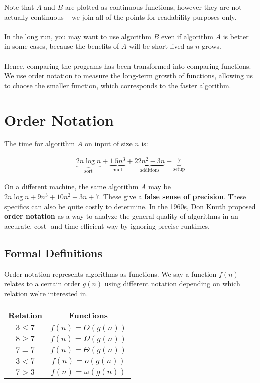 \documentclass[]{article}
\theoremstyle{definition}
\newcommand{\lecture}[1]{\marginpar{{\footnotesize $\leftarrow$ \underline{#1}}}}
\begin{document}
			Note that $A$ and $B$ are plotted as continuous functions, however they are not actually continuous -- we join all of the points for readability purposes only.
			\\ \\
			In the long run, you may want to use algorithm $B$ even if algorithm $A$ is better in some cases, because the benefits of $A$ will be short lived as $n$ grows.
			\\ \\
			Hence, comparing the programs has been transformed into comparing functions. We use order notation to measure the long-term growth of functions, allowing us to choose the smaller function, which corresponds to the faster algorithm.

	\section{Order Notation} \lecture{January 10, 2013}
		The time for algorithm $A$ on input of size $n$ is:

		\begin{align*}
			\underbrace{2n \log n}_\text{sort} + \underbrace{1.5n^3}_\text{mult} + \underbrace{22n^2 - 3n}_\text{additions} + \underbrace{7}_\text{setup}
		\end{align*}

		On a different machine, the same algorithm $A$ may be $2n \log n + 9n^3 + 10n^2 - 3n + 7$. These give a \textbf{false sense of precision}. These specifics can also be quite costly to determine. In the 1960s, Don Knuth proposed \textbf{order notation} as a way to analyze the general quality of algorithms in an accurate, cost- and time-efficient way by ignoring precise runtimes.

		\subsection{Formal Definitions}
			Order notation represents algorithms as functions. We say a function $f(n)$ relates to a certain order $g(n)$ using different notation depending on which relation we're interested in.
			\begin{center}
				\begin{tabular}{|c|c|}
					\hline
					 Relation & Functions \\ \hline
					 $3 \le 7$ & $f(n) = O(g(n))$ \\
					 $8 \ge 7$ & $f(n) = \Omega(g(n))$ \\
					 $7 = 7$ & $f(n) = \Theta(g(n))$ \\
					 $3 < 7$ & $f(n) = o(g(n))$ \\
					 $7 > 3$ & $f(n) = \omega(g(n))$ \\ \hline
				\end{tabular}
			\end{center}
\end{document}
